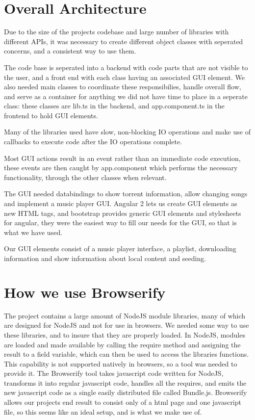 \section{Overall Architecture}
Due to the size of the projects codebase and large number of libraries with different APIs, 
it was necessary to create different object classes with seperated concerns,
and a consistent way to use them.

The code base is seperated into a backend with code parts that are not visible to the user,
and a front end with each class having an associated GUI element.
We also needed main classes to coordinate these responsibilies, handle overall flow,
and serve as a container for anything we did not have time to place in a seperate class:
these classes are lib.ts in the backend,
and app.component.ts in the frontend to hold GUI elements.

Many of the libraries used have slow, non-blocking IO operations
and make use of callbacks to execute code after the IO operations complete.

Most GUI actions result in an event rather than an immediate code execution, 
these events are then caught by app.component
which performs the necessary functionality, through the other classes when relevant.
\newline

The GUI needed databindings to show torrent information, allow changing songs
and implement a music player GUI. 
Angular 2 lets us create GUI elements as new HTML tags, 
and bootstrap provides generic GUI elements and stylesheets for angular, 
they were the easiest way to fill our needs for the GUI,
so that is what we have used.

Our GUI elements consist of a music player interface, a playlist, downloading information 
and show information about local content and seeding.
\newline

\section{How we use Browserify}
The project contains a large amount of NodeJS module libraries, 
many of which are designed for NodeJS and not for use in browsers.
We needed some way to use these libraries, and to insure that they are properly loaded.
In NodeJS, modules are loaded and made available by calling the require method 
and assigning the result to a field variable, which can then be used to access the libraries functions.
This capability is not supported natively in browsers, so a tool was needed to provide it.
The Browserify tool takes javascript code written for NodeJS, 
transforms it into regular javascript code, 
handles all the requires, 
and emits the new javascript code as a single easily distributed file called Bundle.js.
Browserify allows our projects end result to consist only of a html page and one javascript file, 
so this seems like an ideal setup, and is what we make use of.
\newline

